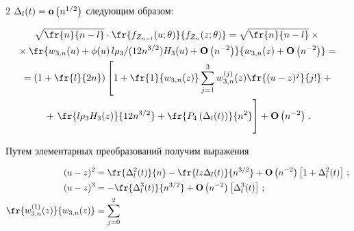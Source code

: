 \begin{multicols}{2}
  $\Delta_l(t)={\bf o}\left(n^{1/2}\right)$ следующим образом:


\begin{multline}  


\sqrt{\fr{n}{n-l}}\cdot


      \fr{f_{Z_{n-l}}(u;\theta)}{f_{Z_n}(z;\theta)}=


     \sqrt{\fr{n}{n-l}}\times{}\\


     {}\times


      \fr{w_{3,n}(u)+


      \phi(u)\, l\rho_3/(12n^{3/2}) H_3(u)+


      {\bf O}\left(n^{-2}\right)}


      {w_{3,n}(z)+{\bf O}\left(n^{-2}\right)}={}\\


{}    =\left(1+\fr{l}{2n} \right) \left[1+


         \fr{1}{w_{3,n}(z)}\sum_{j=1}^3 w_{3,n}^{(j)}(z)


         \fr{(u-z)^j}{j!} +{}\right.\\


         {}+\left.


         \fr{l\rho_3 H_3(z)}{12n^{3/2}}+


         \fr{P_4\left(\Delta_l(t) \right)}{n^2}


         \vphantom{\sum_{j=1}^3 \fr{(u-z)^j}{j!}}\right ] +


         {\bf O}\left(n^{-2}\right)\,.


      \label{e14c}


  \end{multline}





  Путем элементарных преобразований получим выражения


  \begin{align*}   


(u-z)^2&=\fr{\Delta_l^2(t)}{n}-\fr{lz\Delta_l(t)}{n^{3/2}}+


       {\bf O}\left(n^{-2}\right)\left [1+\Delta_l^2(t)\right ]\,;\\


       (u-z)^3&=-\fr{\Delta_l^3(t)}{n^{3/2}}+


       {\bf O}\left(n^{-2}\right)\left [\Delta_l^3(t)\right ]\,;\\


  \fr{w_{3,n}^{(1)}(z)}{w_{3,n}(z)}&=\sum_{j=0}^2



\end{align*}
\end{multicols}
